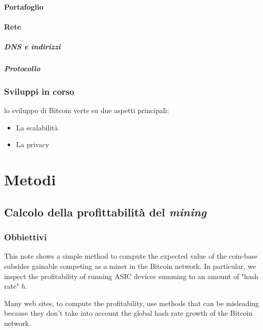 \documentclass{book}
\theoremstyle{definition}
\begin{document}
\newpage
\subsection{Portafoglio}

\newpage
\subsection{Rete}
\subsubsection{DNS e indirizzi}
\subsubsection{Protocollo}

\newpage
\section{Sviluppi in corso}

lo sviluppo di Bitcoin verte su due aspetti principali:

\begin{itemize}
    \item La scalabilità
    \item La privacy
\end{itemize}

\newpage
\part{Metodi}

\chapter{Calcolo della profittabilità del \textit{mining}}

\section{Obbiettivi}

This note shows a simple method to compute the expected value of the coin-base subsides gainable competing as a miner in the Bitcoin network.
In particular, we inspect the profitability of running ASIC devices summing to an amount of "hash rate" $h$.

Many web sites, to compute the profitability, use methods that can be misleading because they don't take into account the global hash rate growth of the Bitcoin network.
\end{document}
